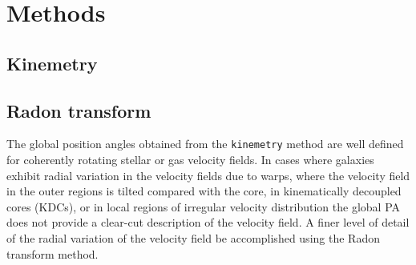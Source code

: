 \section{Methods}
\label{methods}

\subsection{Kinemetry}





\subsection{Radon transform}

The global position angles obtained from the \texttt{kinemetry} method are well defined for coherently rotating stellar or gas velocity fields. In cases where galaxies exhibit radial variation in the velocity fields due to warps, where the velocity field in the outer regions is tilted compared with the core, in kinematically decoupled cores (KDCs), or in local regions of irregular velocity distribution the global PA does not provide a clear-cut description of the velocity field. A finer level of detail of the radial variation of the velocity field be accomplished using the Radon transform method. 
